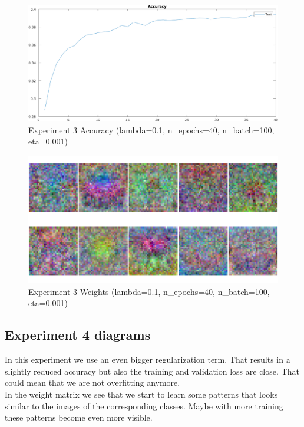     \begin{figure}[ht]
        \includegraphics[width=\textwidth]{../code/result_pics/lambda=.1, n_epochs=40, n_batch=100, eta=.001/accuracy.png}
        \caption{Experiment 3 Accuracy (lambda=0.1, n\_epochs=40, n\_batch=100, eta=0.001)}
        \label{fig:accuracy3}
    \end{figure}

    \begin{figure}[ht]
        \includegraphics[width=\textwidth]{../code/result_pics/lambda=.1, n_epochs=40, n_batch=100, eta=.001/weights.png}
        \caption{Experiment 3 Weights (lambda=0.1, n\_epochs=40, n\_batch=100, eta=0.001)}
        \label{fig:weights3}
    \end{figure}

\clearpage
\subsection{Experiment 4 diagrams}
In this experiment we use an even bigger regularization term. That results in a slightly reduced accuracy but also the training 
and validation loss are close. That could mean that we are not overfitting anymore.\\
In the weight matrix we see that we start to learn some patterns that looks similar to the images of the corresponding classes. 
Maybe with more training these patterns become even more visible.

